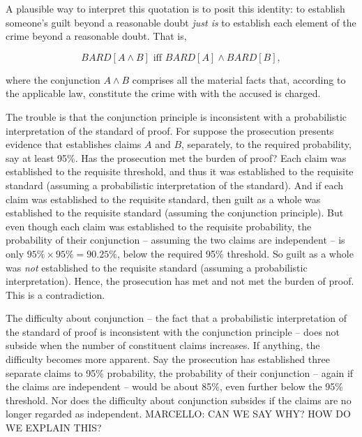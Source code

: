 \documentclass[10pt,dvipsnames,enabledeprecatedfontcommands]{scrartcl}
\newcommand{\et}{\wedge}
\begin{document}
\noindent A plausible way to interpret this quotation is to posit this
identity: to establish someone's guilt beyond a reasonable doubt
\textit{just is} to establish each element of the crime beyond a
reasonable doubt. That is,

\[BARD[A \wedge B] \text{ iff } BARD[A] \wedge BARD[B],\]

\noindent where the conjunction \(A \et B\) comprises all the material
facts that, according to the applicable law, constitute the crime with
with the accused is charged.

The trouble is that the conjunction principle is inconsistent with a
probabilistic interpretation of the standard of proof. For suppose the
prosecution presents evidence that establishes claims \(A\) and \(B\),
separately, to the required probability, say at least 95\%. Has the
prosecution met the burden of proof? Each claim was established to the
requisite threshold, and thus it was established to the requisite
standard (assuming a probabilistic interpretation of the standard). And
if each claim was established to the requisite standard, then guilt as a
whole was established to the requisite standard (assuming the
conjunction principle). But even though each claim was established to
the requisite probability, the probability of their conjunction --
assuming the two claims are independent -- is only
\(95\%\times95\%=90.25\%\), below the required 95\% threshold. So guilt
as a whole was \textit{not} established to the requisite standard
(assuming a probabilistic interpretation). Hence, the prosecution has
met and not met the burden of proof. This is a contradiction.

The difficulty about conjunction -- the fact that a probabilistic
interpretation of the standard of proof is inconsistent with the
conjunction principle -- does not subside when the number of constituent
claims increases. If anything, the difficulty becomes more apparent. Say
the prosecution has established three separate claims to 95\%
probability, the probability of their conjunction -- again if the claims
are independent -- would be about 85\%, even further below the 95\%
threshold. Nor does the difficulty about conjunction subsides if the
claims are no longer regarded as independent. MARCELLO: CAN WE SAY WHY?
HOW DO WE EXPLAIN THIS?
\end{document}
